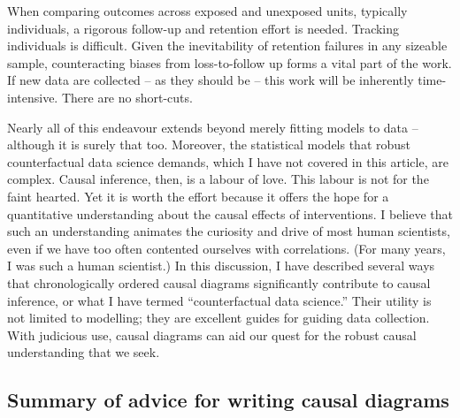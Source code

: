 \documentclass[
  singlecolumn]{report}
\begin{document}
When comparing outcomes across exposed and unexposed units, typically
individuals, a rigorous follow-up and retention effort is needed.
Tracking individuals is difficult. Given the inevitability of retention
failures in any sizeable sample, counteracting biases from
loss-to-follow up forms a vital part of the work. If new data are
collected -- as they should be -- this work will be inherently
time-intensive. There are no short-cuts.

Nearly all of this endeavour extends beyond merely fitting models to
data -- although it is surely that too. Moreover, the statistical models
that robust counterfactual data science demands, which I have not
covered in this article, are complex. Causal inference, then, is a
labour of love. This labour is not for the faint hearted. Yet it is
worth the effort because it offers the hope for a quantitative
understanding about the causal effects of interventions. I believe that
such an understanding animates the curiosity and drive of most human
scientists, even if we have too often contented ourselves with
correlations. (For many years, I was such a human scientist.) In this
discussion, I have described several ways that chronologically ordered
causal diagrams significantly contribute to causal inference, or what I
have termed ``counterfactual data science.'' Their utility is not
limited to modelling; they are excellent guides for guiding data
collection. With judicious use, causal diagrams can aid our quest for
the robust causal understanding that we seek.

\hypertarget{summary-of-advice-for-writing-causal-diagrams}{%
\subsection{Summary of advice for writing causal
diagrams}\label{summary-of-advice-for-writing-causal-diagrams}}
\end{document}
